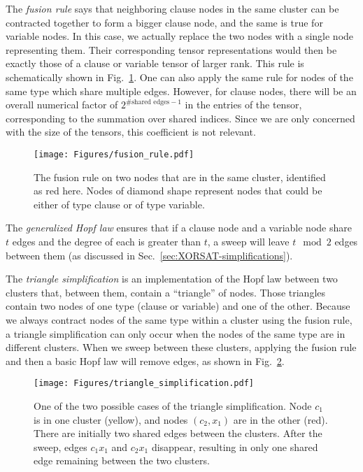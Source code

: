 The \emph{fusion rule} says that neighboring clause nodes in the same cluster can be contracted together to form a bigger clause node, and the same is true for variable nodes.
In this case, we actually replace the two nodes with a single node representing them.
Their corresponding tensor representations would then be exactly those of a clause or variable tensor of larger rank.
This rule is schematically shown in Fig.~\ref{fig:fusion_rule}.
One can also apply the same rule for nodes of the same type which share multiple edges.
However, for clause nodes, there will be an overall numerical factor of $2^{\#\text{shared edges} - 1}$ in the entries of the tensor, corresponding to the summation over shared indices.
Since we are only concerned with the size of the tensors, this coefficient is not relevant.
\begin{figure}[htbp]
    \centering
    \texttt{[image: Figures/fusion\_rule.pdf]}
    \caption{\label{fig:fusion_rule}The fusion rule on two nodes that are in the same cluster, identified as red here.
    Nodes of diamond shape represent nodes that could be either of type clause or of type variable.}
\end{figure}

The \emph{generalized Hopf law} ensures that if a clause node and a variable node share $t$ edges and the degree of each is greater than $t$, a sweep will leave $t\mod{2}$ edges between them (as discussed in Sec.~\ref{sec:XORSAT-simplifications}).

The \emph{triangle simplification} is an implementation of the Hopf law between two clusters that, between them, contain a ``triangle'' of nodes.
Those triangles contain two nodes of one type (clause or variable) and one of the other.
Because we always contract nodes of the same type within a cluster using the fusion rule, a triangle simplification can only occur when the nodes of the same type are in different clusters.
When we sweep between these clusters, applying the fusion rule and then a basic Hopf law will remove edges, as shown in Fig.~\ref{fig:triangle_rule}.
\begin{figure}[htbp]
    \centering
    \texttt{[image: Figures/triangle\_simplification.pdf]}
    \caption{\label{fig:triangle_rule}One of the two possible cases of the triangle simplification.
    Node $c_1$ is in one cluster (yellow), and nodes $(c_2, x_1)$ are in the other (red).
    There are initially two shared edges between the clusters.
    After the sweep, edges $c_1x_1$ and $c_2x_1$ disappear, resulting in only one shared edge remaining between the two clusters.}
\end{figure}

